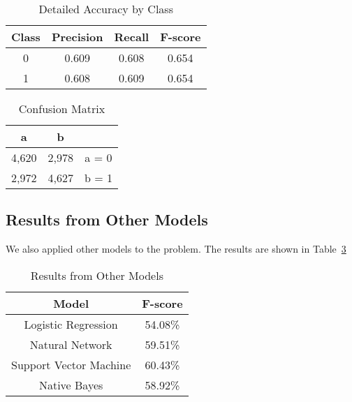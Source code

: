 \begin{table}
\begin{center}
\begin{tabular}{|c|c|c|c|}
\hline
Class & Precision & Recall & F-score \\ \hline
0 & 0.609 & 0.608 & 0.654 \\ \hline
1 & 0.608 & 0.609 & 0.654 \\ \hline
\end{tabular}
\caption{Detailed Accuracy by Class}
\label{table:accuracy}
\end{center}
\end{table}

\begin{table}
\begin{center}
\begin{tabular}{|c|c|c|}
\hline
a & b & \\ \hline
4,620 & 2,978 & a = 0 \\ \hline
2,972 & 4,627 & b = 1 \\ \hline
\end{tabular}
\caption{Confusion Matrix}
\label{table:matrix}
\end{center}
\end{table}

\subsection{Results from Other Models}
We also applied other models to the problem.
 The results are shown in Table~\ref{table:others}

\begin{table}
\begin{center}
\begin{tabular}{|c|c|}
\hline
Model & F-score \\ \hline
Logistic Regression & 54.08\% \\ \hline
Natural Network & 59.51\% \\ \hline
Support Vector Machine & 60.43\% \\ \hline
Native Bayes & 58.92\% \\ \hline
\end{tabular}
\caption{Results from Other Models}
\label{table:others}
\end{center}
\end{table}
